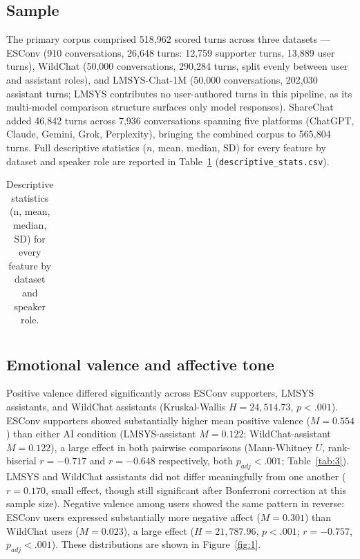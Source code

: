 \documentclass[11pt]{article}
\begin{document}
\subsection{Sample}

The primary corpus comprised 518{,}962 scored turns across three datasets --- ESConv (910 conversations, 26{,}648 turns: 12{,}759 supporter turns, 13{,}889 user turns), WildChat (50{,}000 conversations, 290{,}284 turns, split evenly between user and assistant roles), and LMSYS-Chat-1M (50{,}000 conversations, 202{,}030 assistant turns; LMSYS contributes no user-authored turns in this pipeline, as its multi-model comparison structure surfaces only model responses). ShareChat added 46{,}842 turns across 7{,}936 conversations spanning five platforms (ChatGPT, Claude, Gemini, Grok, Perplexity), bringing the combined corpus to 565{,}804 turns. Full descriptive statistics ($n$, mean, median, SD) for every feature by dataset and speaker role are reported in Table~\ref{tab:1} (\texttt{descriptive\_stats.csv}).

\begin{table}[htbp]
\centering
\caption{Descriptive statistics (n, mean, median, SD) for every feature by dataset and speaker role.}
\label{tab:1}
\begin{tabular}{l}
\toprule
\bottomrule
\end{tabular}
\end{table}

\subsection{Emotional valence and affective tone}

Positive valence differed significantly across ESConv supporters, LMSYS assistants, and WildChat assistants (Kruskal-Wallis $H = 24{,}514.73$, $p < .001$). ESConv supporters showed substantially higher mean positive valence ($M = 0.554$) than either AI condition (LMSYS-assistant $M = 0.122$; WildChat-assistant $M = 0.122$), a large effect in both pairwise comparisons (Mann-Whitney $U$, rank-biserial $r = -0.717$ and $r = -0.648$ respectively, both $p_{adj} < .001$; Table~\ref{tab:3}). LMSYS and WildChat assistants did not differ meaningfully from one another ($r = 0.170$, small effect, though still significant after Bonferroni correction at this sample size). Negative valence among users showed the same pattern in reverse: ESConv users expressed substantially more negative affect ($M = 0.301$) than WildChat users ($M = 0.023$), a large effect ($H = 21{,}787.96$, $p < .001$; $r = -0.757$, $p_{adj} < .001$). These distributions are shown in Figure~\ref{fig:1}.
\end{document}
